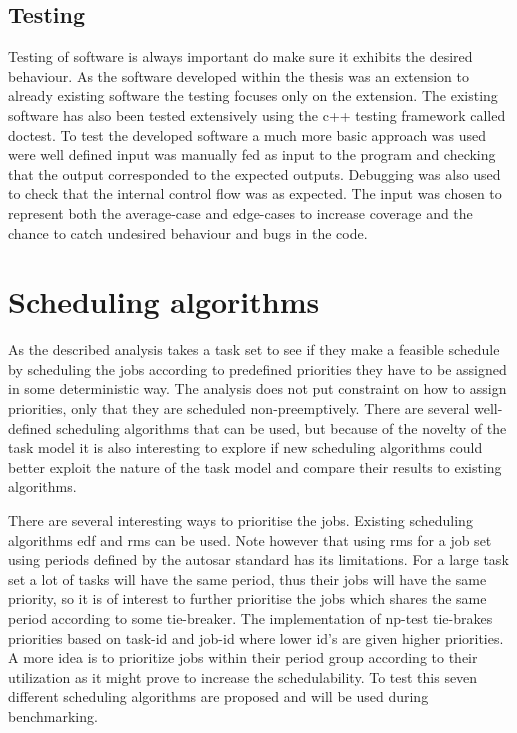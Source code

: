 \documentclass{kththesis}
\begin{document}
\subsection{Testing}

Testing of software is always important do make sure it exhibits the desired behaviour. As the
software developed within the thesis was an extension to already existing software the testing
focuses only on the extension. The existing software has also been tested extensively using the c++
testing framework called doctest. To test the developed software a much more basic approach was used
were well defined input was manually fed as input to the program and checking that the output
corresponded to the expected outputs. Debugging was also used to check that the internal control
flow was as expected. The input was chosen to represent both the average-case and edge-cases to
increase coverage and the chance to catch undesired behaviour and bugs in the code.


\section{Scheduling algorithms} \label{sec:scheduling_algorithms}

As the described analysis takes a task set to see if they make a feasible schedule by
scheduling the jobs according to predefined priorities they have to be assigned in some
deterministic way. The analysis does not put constraint on how to assign priorities, only that they
are scheduled non-preemptively. There are several well-defined scheduling algorithms that can be
used, but because of the novelty of the task model it is also interesting to explore
if new scheduling algorithms could better exploit the nature of the task model and compare their
results to existing algorithms.

There are several interesting ways to prioritise the jobs. Existing scheduling algorithms
\acrshort{edf} and \acrshort{rms} can be used. Note however that using \acrshort{rms} for a job
set using periods defined by the \acrshort{autosar} standard has its limitations. For a large task
set a lot of tasks will have the same period, thus their jobs will have the same priority, so it is
of interest to further prioritise the jobs which shares the same period according to some
tie-breaker. The implementation of \acrshort{np}-test tie-brakes priorities based on task-id and
job-id where lower id's are given higher priorities. A more  idea is to prioritize jobs within their
period group according to their utilization as it might prove to increase the schedulability. To
test this seven different scheduling algorithms are proposed and will be used during benchmarking.
\end{document}
